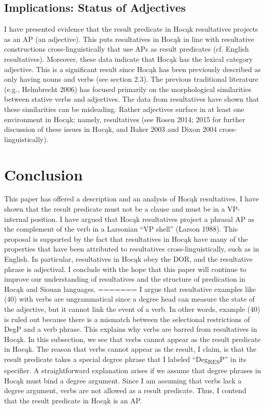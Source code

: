 \documentclass[output=paper]{LSP/langsci}
\begin{document}
\begin{exe}
\begin{exe}
\begin{exe}
\begin{exe}
{\begin{exe}
\subsection{Implications: Status of Adjectives}

I have presented evidence that the result predicate in Hocąk resultatives projects as an AP (an adjective). This puts resultatives in Hocąk in line with resultative constructions cross-linguistically that use APs as result predicates (cf. English resultatives). Moreover, these data indicate that Hocąk has the lexical category adjective. This is a significant result since Hocąk has been previously described as only having nouns and verbs (see section 2.3). The previous traditional literature (e.g., Helmbrecht 2006) has focused primarily on the morphological similarities between stative verbs and adjectives. The data from resultatives have shown that these similarities can be misleading. Rather adjectives surface in at least one environment in Hocąk; namely, resultatives (see Rosen 2014; 2015 for further discussion of these issues in Hocąk, and Baker 2003 and Dixon 2004 cross-linguistically).

\section{Conclusion}
This paper has offered a description and an analysis of Hocąk resultatives. I have shown that the result predicate must not be a clause and must be in a VP-internal position. I have argued that Hocąk resultatives project a phrasal AP as the complement of the verb in a Larsonian ``VP shell'' (Larson 1988). This proposal is supported by the fact that resultatives in Hocąk have many of the properties that have been attributed to resultatives cross-linguistically, such as in English. In particular, resultatives in Hocąk obey the DOR, and the resultative phrase is adjectival. I conclude with the hope that this paper will continue to improve our understanding of resultatives and the structure of predication in Hocąk and Siouan languages.
=======
I argue that resultative examples like (40) with verbs are ungrammatical since a degree head can measure the state of the adjective, but it cannot link the event of a verb. In other words, example (40) is ruled out because there is a mismatch between the selectional restrictions of DegP and a verb phrase. This explains why verbs are barred from resultatives in Hoc\k{a}k. In this subsection, we see that verbs cannot appear as the result predicate in Hoc\k{a}k. The reason that verbs cannot appear as the result, I claim, is that the result predicate takes a special degree phrase that I labeled ``Deg\textsubscript{RES}P'' in its specifier. A straightforward explanation arises if we assume that degree phrases in Hoc\k{a}k must bind a degree argument. Since I am assuming that verbs lack a degree argument, verbs are not allowed as a result predicate. Thus, I contend that the result predicate in Hoc\k{a}k is an AP.


\end{exe}}
\end{exe}
\end{exe}
\end{exe}
\end{exe}
\end{document}
